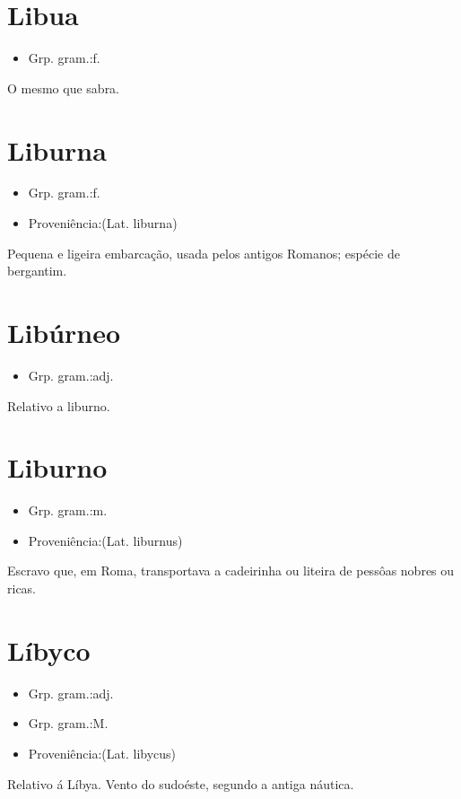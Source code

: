 \section{Libua}
\begin{itemize}
\item {Grp. gram.:f.}
\end{itemize}
O mesmo que \textunderscore sabra\textunderscore .
\section{Liburna}
\begin{itemize}
\item {Grp. gram.:f.}
\end{itemize}
\begin{itemize}
\item {Proveniência:(Lat. \textunderscore liburna\textunderscore )}
\end{itemize}
Pequena e ligeira embarcação, usada pelos antigos Romanos; espécie de bergantim.
\section{Libúrneo}
\begin{itemize}
\item {Grp. gram.:adj.}
\end{itemize}
Relativo a liburno.
\section{Liburno}
\begin{itemize}
\item {Grp. gram.:m.}
\end{itemize}
\begin{itemize}
\item {Proveniência:(Lat. \textunderscore liburnus\textunderscore )}
\end{itemize}
Escravo que, em Roma, transportava a cadeirinha ou liteira de pessôas nobres ou ricas.
\section{Líbyco}
\begin{itemize}
\item {Grp. gram.:adj.}
\end{itemize}
\begin{itemize}
\item {Grp. gram.:M.}
\end{itemize}
\begin{itemize}
\item {Proveniência:(Lat. \textunderscore libycus\textunderscore )}
\end{itemize}
Relativo á Líbya.
Vento do sudoéste, segundo a antiga náutica.
